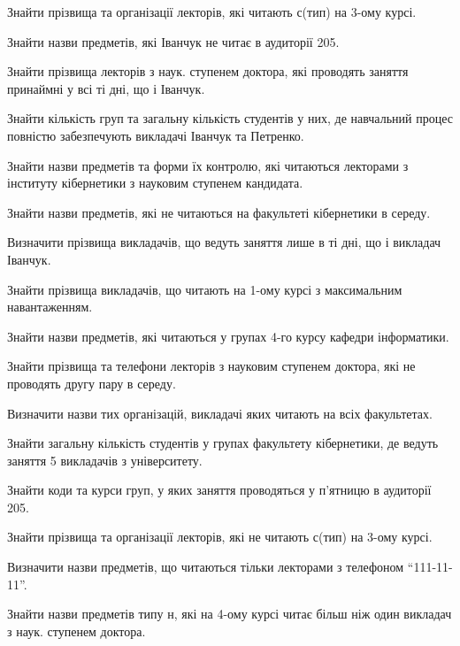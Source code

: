 \begin{card}
    \item Знайти прізвища та організації лекторів, які читають с (тип) на 3-ому курсі.
    \item Знайти назви предметів, які Іванчук не читає в аудиторії 205.
    \item Знайти прізвища лекторів з наук. ступенем доктора, які проводять заняття принаймні у всі ті дні, що і Іванчук. 
    \item Знайти кількість груп та загальну кількість студентів у них, де навчальний процес повністю забезпечують викладачі Іванчук та Петренко.
\end{card}

\begin{card}
    \item Знайти назви предметів та форми їх контролю, які читаються лекторами з інституту кібернетики з науковим ступенем кандидата.
    \item Знайти назви предметів, які не читаються на факультеті кібернетики в середу.
    \item Визначити прізвища викладачів, що ведуть заняття лише в ті дні, що і викладач Іванчук. 
    \item Знайти прізвища викладачів, що читають на 1-ому курсі з максимальним навантаженням.
\end{card}

\begin{card}
    \item Знайти назви предметів, які читаються у групах 4-го курсу кафедри інформатики.
    \item Знайти прізвища та телефони лекторів з науковим ступенем доктора, які не проводять другу пару в середу.
    \item Визначити назви тих організацій, викладачі яких читають на всіх факультетах. 
    \item Знайти загальну кількість студентів у групах факультету кібернетики, де ведуть заняття 5 викладачів з університету.
\end{card}

\begin{card}
    \item Знайти коди та курси груп, у яких заняття проводяться у п'ятницю в аудиторії 205.
    \item Знайти прізвища та організації лекторів, які не читають с (тип) на 3-ому курсі.
    \item Визначити назви предметів, що читаються тільки лекторами з телефоном ``111-11-11''.
    \item Знайти назви предметів типу н, які на 4-ому курсі читає більш ніж один викладач з наук. ступенем доктора.
\end{card}

